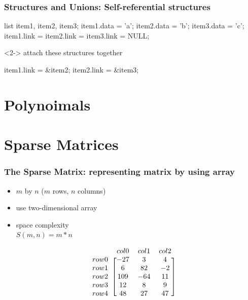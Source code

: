 \documentclass[newPxFont,sthlmFooter,nooffset]{beamer}
\begin{document}
\begin{frame}[t, fragile]
  \frametitle{Structures and Unions: {\large Self-referential structures}}
\begin{codedef}
list item1, item2, item3;
item1.data = 'a';
item2.data = 'b';
item3.data = 'c';
item1.link = item2.link = item3.link = NULL;   
\end{codedef}
\begin{uncoverenv}<2->
attach these structures together
\begin{codedef}
item1.link = &item2;
item2.link = &item3;
\end{codedef}
\end{uncoverenv}
\end{frame}




\section{Polynoimals}

\section{Sparse Matrices}

\begin{frame}[t, fragile]
  \frametitle{The Sparse Matrix: {\large representing matrix by using array}}
  \begin{itemize}
  \item $m$ by $n$ ($m$ rows, $n$ columns)
  \item use two-dimensional array
  \item space complexity \\
        $S(m, n) = m *n$
  \end{itemize}

\begin{equation*}
  \begin{blockarray}{r *{3}{c}}
      & col0 & col1 & col2 \\
\begin{block}{l [*{3}{c}]}
 row0 & -27  &   3  &  4   \\
 row1 &   6  &  82  &  -2  \\
 row2 & 109  & -64  &  11   \\
 row3 &  12  &   8  &  9   \\
 row4 &  48  &  27  & 47   \\
\end{block}
  \end{blockarray}
\end{equation*}
\end{frame}
\end{document}
